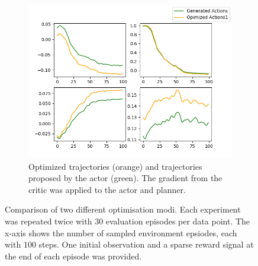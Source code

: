 \begin{figure}[htbp]
\begin{subfigure}[t]{0.45\textwidth}
      \label{fig:direct_actions}
    \end{subfigure}
    \hfill
    \begin{subfigure}[t]{0.45\textwidth}
      \includegraphics[width=\textwidth]{images/Plan_vs_Actions/changes/plans_actor_0.png}
      \caption{Optimized trajectories (orange) and trajectories proposed by the actor (green). The gradient from the critic was applied to the actor and planner.}
      \label{fig:ac_pl_actions}
    \end{subfigure}
    \caption{Comparison of two different optimisation modi. Each experiment was repeated twice with 30 evaluation episodes per data point.
    The x-axis shows the number of sampled environment epsiodes, each with 100 steps. One initial observation and a sparse reward signal at the end of each episode was provided.}
    \label{fig:action_vs_actor}
\end{figure}

